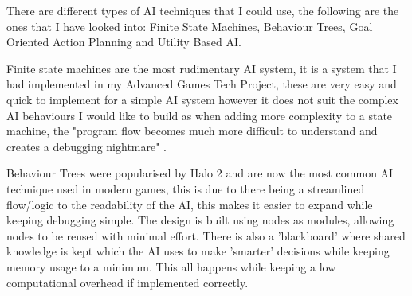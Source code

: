 \documentclass[11pt]{report}
\begin{document}
There are different types of AI techniques that I could use, the following are the ones that I have looked into: Finite State Machines, Behaviour Trees, Goal Oriented Action Planning and Utility Based AI.

Finite state machines are the most rudimentary AI system, it is a system that I had implemented in my Advanced Games Tech Project, these are very easy and quick to implement for a simple AI system however it does not suit the complex AI behaviours I would like to build as when adding more complexity to a state machine, the "program flow becomes much more difficult to understand and creates a debugging nightmare" \cite{gameAiByExample}.

Behaviour Trees were popularised by Halo 2\cite{halo2} and are now the most common AI technique used in modern games, this is due to there being a streamlined flow/logic to the readability of the AI, this makes it easier to expand while keeping debugging simple. The design is built using nodes as modules, allowing nodes to be reused with minimal effort. There is also a 'blackboard' where shared knowledge is kept which the AI uses to make 'smarter' decisions while keeping memory usage to a minimum. This all happens while keeping a low computational overhead if implemented correctly. \cite{behaviourTrees}
\end{document}
